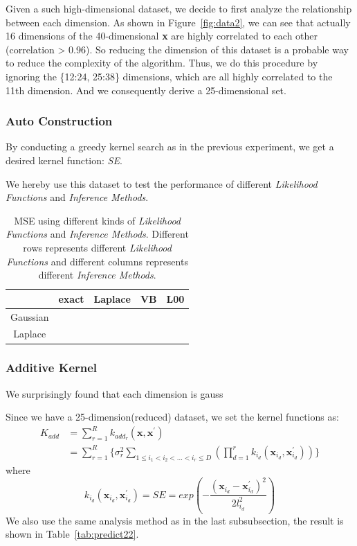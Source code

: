 Given a such high-dimensional dataset, we decide to first analyze the relationship between each dimension.
As shown in Figure~\ref{fig:data2}, we can see that actually 16 dimensions of the 40-dimensional \textbf{x} are highly correlated to each other (correlation > 0.96).
So reducing the dimension of this dataset is a probable way to reduce the complexity of the algorithm.
Thus, we do this procedure by ignoring the \{12:24, 25:38\} dimensions, which are all highly correlated to the 11th dimension. And we consequently derive a 25-dimensional set.


\subsubsection{Auto Construction}
By conducting a greedy kernel search as in the previous experiment, we get a desired kernel function: \emph{SE}.

We hereby use this dataset to test the performance of different \emph{Likelihood Functions} and \emph{Inference Methods}.

\begin{table}[h]
\centering
{\small
\begin{tabular}{|c|cccc|}
    \hline
	    & exact & Laplace & VB & L00 \\ 
    \hline
	   Gaussian & & & & \\
	   Laplace & & & & \\
    \hline
\end{tabular}
}
\caption{MSE using different kinds of \emph{Likelihood Functions} and \emph{Inference Methods}. Different rows represents different \emph{Likelihood Functions} and different columns represents different \emph{Inference Methods}. }
\label{tab:predict21}
\end{table}



\subsubsection{Additive Kernel}

We surprisingly found that each dimension is gauss

Since we have a 25-dimension(reduced) dataset, we set the kernel functions as:
\begin{equation}
\begin{aligned}
K_{add} &= \sum_{r=1}^{R} k_{add_{r}} (\textbf{x},\textbf{x}^{'}) \\
 &= \sum_{r=1}^{R} \{ \sigma^2_r \sum_{1 \leqslant i_1 < i_2 < ... < i_r \leqslant D} ( \prod_{d=1}^{r} k_{i_d} (\textbf{x}_{i_d},\textbf{x}_{i_d}^{'}) ) \}
\end{aligned}
\end{equation}
where 
\begin{equation}
k_{i_d} (\textbf{x}_{i_d},\textbf{x}_{i_d}^{'}) = SE = exp(-\frac{(\textbf{x}_{i_d}-\textbf{x}_{i_d}^{'})^{2}}{2l_{i_d}^{2}})
\end{equation}
We also use the same analysis method as in the last subsubsection, the result is shown in Table~\ref{tab:predict22}.

